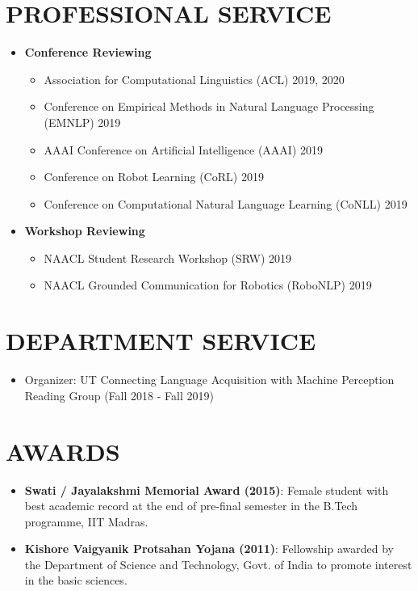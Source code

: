 \documentclass[letterpaper,10pt]{resume}
\begin{document}
{\section{PROFESSIONAL SERVICE}
\begin{itemize}
\item \textbf{Conference Reviewing}
\begin{itemize}
\item Association for Computational Linguistics (ACL) 2019, 2020
\item Conference on Empirical Methods in Natural Language Processing (EMNLP) 2019
\item AAAI Conference on Artificial Intelligence (AAAI) 2019
\item Conference on Robot Learning (CoRL) 2019
\item Conference on Computational Natural Language Learning (CoNLL) 2019
\end{itemize}
\item \textbf{Workshop Reviewing}
\begin{itemize}
\item NAACL Student Research Workshop (SRW) 2019
\item NAACL Grounded Communication for Robotics (RoboNLP) 2019
\end{itemize}
\end{itemize}
\vspace{0.2cm}

\section{DEPARTMENT SERVICE}
\begin{itemize}
\item Organizer: UT Connecting Language Acquisition with Machine Perception Reading Group (Fall 2018 - Fall 2019)
\end{itemize}
\vspace{0.2cm}

\section{AWARDS}
\begin{itemize}
\item \textbf{Swati / Jayalakshmi Memorial Award (2015)}: Female student with best academic record at the end of pre-final semester in the B.Tech programme, IIT Madras.
\item \textbf{Kishore Vaigyanik Protsahan Yojana (2011)}: Fellowship awarded by the Department of Science and Technology, Govt. of India to promote interest in the basic sciences.
\end{itemize}
\vspace{0.2cm}

}
\end{document}
